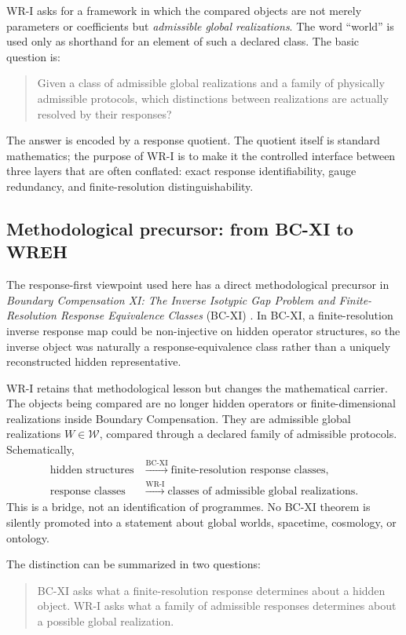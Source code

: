 \documentclass[11pt]{article}
\newcommand{\W}{\mathcal W}
\begin{document}
WR-I asks for a framework in which the compared objects are not merely
parameters or coefficients but \emph{admissible global realizations}. The word
``world'' is used only as shorthand for an element of such a declared class.
The basic question is:
\begin{quote}
Given a class of admissible global realizations and a family of physically
admissible protocols, which distinctions between realizations are actually
resolved by their responses?
\end{quote}
The answer is encoded by a response quotient. The quotient itself is standard
mathematics; the purpose of WR-I is to make it the controlled interface between
three layers that are often conflated: exact response identifiability, gauge
redundancy, and finite-resolution distinguishability.

\subsection*{Methodological precursor: from BC-XI to WREH}

The response-first viewpoint used here has a direct methodological precursor in
\emph{Boundary Compensation XI: The Inverse Isotypic Gap Problem and
Finite-Resolution Response Equivalence Classes} (BC-XI)
\cite{MalachevskyBCXI}. In BC-XI, a finite-resolution inverse response map could
be non-injective on hidden operator structures, so the inverse object was
naturally a response-equivalence class rather than a uniquely reconstructed
hidden representative.

WR-I retains that methodological lesson but changes the mathematical carrier.
The objects being compared are no longer hidden operators or finite-dimensional
realizations inside Boundary Compensation. They are admissible global
realizations $W\in\W$, compared through a declared family of admissible
protocols. Schematically,
\[
\begin{aligned}
\text{hidden structures}
&\xrightarrow{\text{BC-XI}}
\text{finite-resolution response classes},\\
\text{response classes}
&\xrightarrow{\text{WR-I}}
\text{classes of admissible global realizations}.
\end{aligned}
\]
This is a bridge, not an identification of programmes. No BC-XI theorem is
silently promoted into a statement about global worlds, spacetime, cosmology,
or ontology.

The distinction can be summarized in two questions:
\begin{quote}
BC-XI asks what a finite-resolution response determines about a hidden object.
WR-I asks what a family of admissible responses determines about a possible
global realization.
\end{quote}
\end{document}
